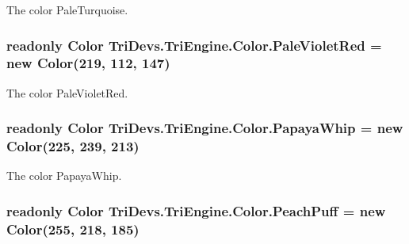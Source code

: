 The color Pale\-Turquoise. 

\hypertarget{struct_tri_devs_1_1_tri_engine_1_1_color_a57b970b634374d67e49f4bab55da3c11}{
\subsubsection[{Pale\-Violet\-Red}]{\setlength{\rightskip}{0pt plus 5cm}readonly {\bf Color} Tri\-Devs.\-Tri\-Engine.\-Color.\-Pale\-Violet\-Red = new {\bf Color}(219, 112, 147)\hspace{0.3cm}{\ttfamily [static]}}}\label{struct_tri_devs_1_1_tri_engine_1_1_color_a57b970b634374d67e49f4bab55da3c11}


The color Pale\-Violet\-Red. 

\hypertarget{struct_tri_devs_1_1_tri_engine_1_1_color_a9414e6848167fdd5138296403e6edf0a}{
\subsubsection[{Papaya\-Whip}]{\setlength{\rightskip}{0pt plus 5cm}readonly {\bf Color} Tri\-Devs.\-Tri\-Engine.\-Color.\-Papaya\-Whip = new {\bf Color}(225, 239, 213)\hspace{0.3cm}{\ttfamily [static]}}}\label{struct_tri_devs_1_1_tri_engine_1_1_color_a9414e6848167fdd5138296403e6edf0a}


The color Papaya\-Whip. 

\hypertarget{struct_tri_devs_1_1_tri_engine_1_1_color_a52a4639ca897c18619a325e4146f329d}{
\subsubsection[{Peach\-Puff}]{\setlength{\rightskip}{0pt plus 5cm}readonly {\bf Color} Tri\-Devs.\-Tri\-Engine.\-Color.\-Peach\-Puff = new {\bf Color}(255, 218, 185)\hspace{0.3cm}{\ttfamily [static]}}}\label{struct_tri_devs_1_1_tri_engine_1_1_color_a52a4639ca897c18619a325e4146f329d}


